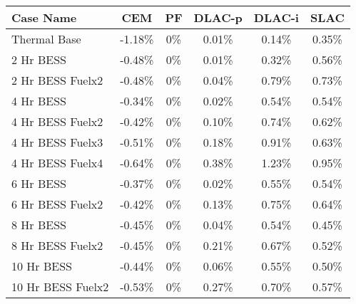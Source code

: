 \begin{tabular}{lccccc}
\toprule
Case Name & CEM & PF & DLAC-p & DLAC-i & SLAC \\
\midrule
Thermal Base & -1.18\% & 0\% & 0.01\% & 0.14\% & 0.35\% \\
2 Hr BESS & -0.48\% & 0\% & 0.01\% & 0.32\% & 0.56\% \\
2 Hr BESS Fuelx2 & -0.48\% & 0\% & 0.04\% & 0.79\% & 0.73\% \\
4 Hr BESS & -0.34\% & 0\% & 0.02\% & 0.54\% & 0.54\% \\
4 Hr BESS Fuelx2 & -0.42\% & 0\% & 0.10\% & 0.74\% & 0.62\% \\
4 Hr BESS Fuelx3 & -0.51\% & 0\% & 0.18\% & 0.91\% & 0.63\% \\
4 Hr BESS Fuelx4 & -0.64\% & 0\% & 0.38\% & 1.23\% & 0.95\% \\
6 Hr BESS & -0.37\% & 0\% & 0.02\% & 0.55\% & 0.54\% \\
6 Hr BESS Fuelx2 & -0.42\% & 0\% & 0.13\% & 0.75\% & 0.64\% \\
8 Hr BESS & -0.45\% & 0\% & 0.04\% & 0.54\% & 0.45\% \\
8 Hr BESS Fuelx2 & -0.45\% & 0\% & 0.21\% & 0.67\% & 0.52\% \\
10 Hr BESS & -0.44\% & 0\% & 0.06\% & 0.55\% & 0.50\% \\
10 Hr BESS Fuelx2 & -0.53\% & 0\% & 0.27\% & 0.70\% & 0.57\% \\
\bottomrule
\end{tabular}
